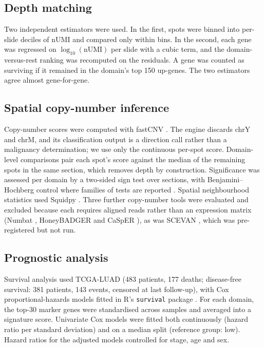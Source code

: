 \subsection{Depth matching}

Two independent estimators were used. In the first, spots were binned into per-slide deciles
of nUMI and compared only within bins. In the second, each gene was regressed on
$\log_{10}(\text{nUMI})$ per slide with a cubic term, and the domain-versus-rest ranking was
recomputed on the residuals. A gene was counted as surviving if it remained in the domain's
top 150 up-genes. The two estimators agree almost gene-for-gene.

\subsection{Spatial copy-number inference}

Copy-number scores were computed with fastCNV \citep{cabrejas2026fastcnv}. The engine
discards chrY and chrM, and its classification
output is a direction call rather than a malignancy determination; we use only the
continuous per-spot score. Domain-level comparisons pair each spot's score against the
median of the remaining spots in the same section, which removes depth by construction.
Significance was assessed per domain by a two-sided sign test over sections, with
Benjamini--Hochberg control where families of tests are reported
\citep{benjamini1995fdr}. Spatial neighbourhood statistics used Squidpy
\citep{palla2022squidpy}. Three further copy-number tools were evaluated and excluded
because each requires aligned reads rather than an expression matrix (Numbat
\citep{gao2023numbat}, HoneyBADGER \citep{fan2018honeybadger} and CaSpER
\citep{serinharmanci2020caspER}), as was SCEVAN \citep{defalco2023scevan}, which was
pre-registered but not run.

\subsection{Prognostic analysis}

Survival analysis used TCGA-LUAD \citep{tcga2014luad} (483 patients, 177 deaths;
disease-free survival: 381 patients, 143 events, censored at last follow-up), with Cox
proportional-hazards models fitted in R's \texttt{survival} package
\citep{therneau2000survival}. For each domain, the top-30 marker genes
were standardised across samples and averaged into a signature score. Univariate Cox models
were fitted both continuously (hazard ratio per standard deviation) and on a median split
(reference group: low). Hazard ratios for the adjusted models controlled for stage, age and
sex.

